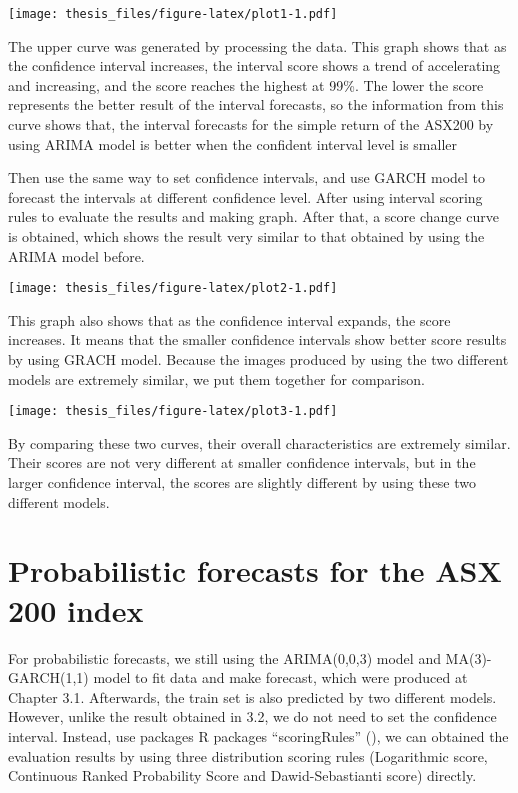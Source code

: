 \documentclass{monashthesis}
\theoremstyle{definition}
\theoremstyle{definition}
\theoremstyle{definition}
\theoremstyle{remark}
\begin{document}
\texttt{[image: thesis\_files/figure-latex/plot1-1.pdf]}

The upper curve was generated by processing the data. This graph shows
that as the confidence interval increases, the interval score shows a
trend of accelerating and increasing, and the score reaches the highest
at 99\%. The lower the score represents the better result of the
interval forecasts, so the information from this curve shows that, the
interval forecasts for the simple return of the ASX200 by using ARIMA
model is better when the confident interval level is smaller

Then use the same way to set confidence intervals, and use GARCH model
to forecast the intervals at different confidence level. After using
interval scoring rules to evaluate the results and making graph. After
that, a score change curve is obtained, which shows the result very
similar to that obtained by using the ARIMA model before.

\texttt{[image: thesis\_files/figure-latex/plot2-1.pdf]}

This graph also shows that as the confidence interval expands, the score
increases. It means that the smaller confidence intervals show better
score results by using GRACH model. Because the images produced by using
the two different models are extremely similar, we put them together for
comparison.

\texttt{[image: thesis\_files/figure-latex/plot3-1.pdf]}

By comparing these two curves, their overall characteristics are
extremely similar. Their scores are not very different at smaller
confidence intervals, but in the larger confidence interval, the scores
are slightly different by using these two different models.

\section{Probabilistic forecasts for the ASX 200
index}\label{probabilistic-forecasts-for-the-asx-200-index}

For probabilistic forecasts, we still using the ARIMA(0,0,3) model and
MA(3)-GARCH(1,1) model to fit data and make forecast, which were
produced at Chapter 3.1. Afterwards, the train set is also predicted by
two different models. However, unlike the result obtained in 3.2, we do
not need to set the confidence interval. Instead, use packages R
packages ``scoringRules'' (\textcite{JKL17}), we can obtained the
evaluation results by using three distribution scoring rules
(Logarithmic score, Continuous Ranked Probability Score and
Dawid-Sebastianti score) directly.
\end{document}

